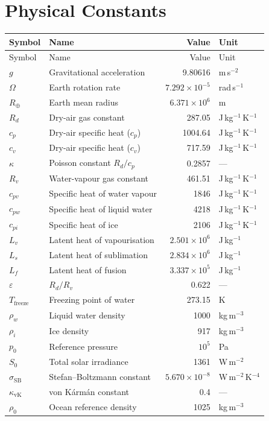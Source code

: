 \documentclass[11pt,twoside]{report}
\newcommand{\Rd}{R_d}
\newcommand{\cpd}{c_p}
\newcommand{\cvd}{c_v}
\newcommand{\Lv}{L_v}
\newcommand{\Ls}{L_s}
\newcommand{\Lf}{L_f}
\newcommand{\Rv}{R_v}
\newcommand{\pref}{p_0}
\newcommand{\SB}{\sigma_{\mathrm{SB}}}
\begin{document}
\chapter{Physical Constants}
\label{ch:constants}

\begin{center}
\begin{longtable}{llrl}
\toprule
Symbol & Name & Value & Unit \\
\midrule
\endfirsthead
\toprule
Symbol & Name & Value & Unit \\
\midrule
\endhead
$g$ & Gravitational acceleration & 9.80616 & m\,s$^{-2}$ \\
$\Omega$ & Earth rotation rate & $7.292\times10^{-5}$ & rad\,s$^{-1}$ \\
$R_{\oplus}$ & Earth mean radius & $6.371\times10^6$ & m \\
$\Rd$ & Dry-air gas constant & 287.05 & J\,kg$^{-1}$\,K$^{-1}$ \\
$\cpd$ & Dry-air specific heat ($c_p$) & 1004.64 & J\,kg$^{-1}$\,K$^{-1}$ \\
$\cvd$ & Dry-air specific heat ($c_v$) & 717.59 & J\,kg$^{-1}$\,K$^{-1}$ \\
$\kappa$ & Poisson constant $\Rd/\cpd$ & 0.2857 & --- \\
$\Rv$ & Water-vapour gas constant & 461.51 & J\,kg$^{-1}$\,K$^{-1}$ \\
$c_{pv}$ & Specific heat of water vapour & 1846 & J\,kg$^{-1}$\,K$^{-1}$ \\
$c_{pw}$ & Specific heat of liquid water & 4218 & J\,kg$^{-1}$\,K$^{-1}$ \\
$c_{pi}$ & Specific heat of ice & 2106 & J\,kg$^{-1}$\,K$^{-1}$ \\
$\Lv$ & Latent heat of vapourisation & $2.501\times10^6$ & J\,kg$^{-1}$ \\
$\Ls$ & Latent heat of sublimation & $2.834\times10^6$ & J\,kg$^{-1}$ \\
$\Lf$ & Latent heat of fusion & $3.337\times10^5$ & J\,kg$^{-1}$ \\
$\varepsilon$ & $\Rd/\Rv$ & 0.622 & --- \\
$T_{\mathrm{freeze}}$ & Freezing point of water & 273.15 & K \\
$\rho_w$ & Liquid water density & 1000 & kg\,m$^{-3}$ \\
$\rho_i$ & Ice density & 917 & kg\,m$^{-3}$ \\
$\pref$ & Reference pressure & $10^5$ & Pa \\
$S_0$ & Total solar irradiance & 1361 & W\,m$^{-2}$ \\
$\SB$ & Stefan--Boltzmann constant & $5.670\times10^{-8}$ & W\,m$^{-2}$\,K$^{-4}$ \\
$\kappa_{\mathrm{vK}}$ & von K\'{a}rm\'{a}n constant & 0.4 & --- \\
$\rho_0$ & Ocean reference density & 1025 & kg\,m$^{-3}$ \\
\bottomrule
\end{longtable}
\end{center}
\end{document}
